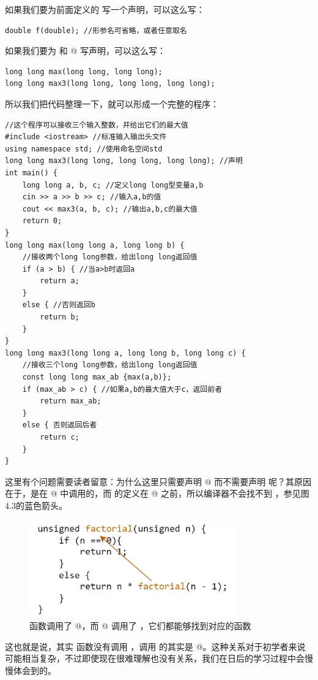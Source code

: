 如果我们要为前面定义的 \lstinline@f@ 写一个声明，可以这么写：
\begin{lstlisting}
double f(double); //形参名可省略，或者任意取名
\end{lstlisting}
如果我们要为 \lstinline@max@ 和 @ 写声明，可以这么写：
\begin{lstlisting}
long long max(long long, long long); 
long long max3(long long, long long, long long);
\end{lstlisting}\par
所以我们把代码整理一下，就可以形成一个完整的程序：
\begin{lstlisting}[caption=\texttt{max3.cpp},label=lst:max3]
//这个程序可以接收三个输入整数，并给出它们的最大值
#include <iostream> //标准输入输出头文件
using namespace std; //使用命名空间std
long long max3(long long, long long, long long); //声明
int main() {
    long long a, b, c; //定义long long型变量a,b
    cin >> a >> b >> c; //输入a,b的值
    cout << max3(a, b, c); //输出a,b,c的最大值
    return 0;
}
long long max(long long a, long long b) {
    //接收两个long long参数，给出long long返回值
    if (a > b) { //当a>b时返回a
        return a;
    }
    else { //否则返回b
        return b;
    }
}
long long max3(long long a, long long b, long long c) {
    //接收三个long long参数，给出long long返回值
    const long long max_ab {max(a,b)};
    if (max_ab > c) { //如果a,b的最大值大于c，返回前者
        return max_ab;
    }
    else { 否则返回后者
        return c;
    }
}
\end{lstlisting}
这里有个问题需要读者留意：为什么这里只需要声明 @ 而不需要声明 \lstinline@max@ 呢？其原因在于，\lstinline@max@ 是在 @ 中调用的，而 \lstinline@max@ 的定义在 @ 之前，所以编译器不会找不到 \lstinline@max@，参见图4.3的蓝色箭头。\par
\begin{figure}[htbp]
    \centering
    \includegraphics[width=0.8\textwidth]{../images/generalized_parts/04_max3_code_logic_300.png}
    \caption{\lstinline@main@ 函数调用了 @，而 @ 调用了 \lstinline@max@，它们都能够找到对应的函数}
\end{figure}
这也就是说，其实 \lstinline@main@ 函数没有调用 \lstinline@max@，调用 \lstinline@max@ 的其实是 @。这种关系对于初学者来说可能相当复杂，不过即使现在很难理解也没有关系，我们在日后的学习过程中会慢慢体会到的。\par
